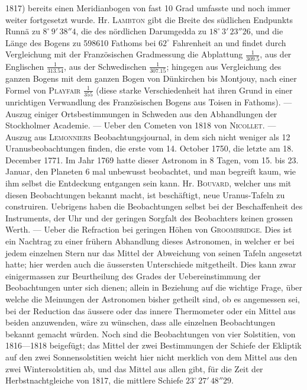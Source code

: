 1817) bereits einen Meridianbogen von fast 10 Grad umfasste und noch immer weiter fortgesetzt wurde. Hr. \textsc{Lambton} gibt die Breite des südlichen Endpunkts Runnä zu $8^\circ\,9'\,38''4$, die des nördlichen Darumgedda zu $18^\circ\,3'\,23''26$, und die Länge des Bogens zu 598610 Fathoms bei $62^\circ$ Fahrenheit an und findet durch Vergleichung mit der Französischen Gradmessung die Abplattung $\frac{1}{309.5}$, aus der Englischen $\frac{1}{313.54}$, aus der Schwedischen $\frac{1}{307.15}$; hingegen aus Vergleichung des ganzen Bogens mit dem ganzen Bogen von Dünkirchen bis Montjouy, nach einer Formel von \textsc{Playfair} $\frac{1}{355}$ (diese starke Verschiedenheit hat ihren Grund in einer unrichtigen Verwandlung des Französischen Bogens aus Toisen in Fathoms). --- Auszug einiger Ortsbestimmungen in Schweden aus den Abhandlungen der Stockholmer Academie. --- Ueber den Cometen von 1818 von \textsc{Nicollet}. --- Auszug aus \textsc{Lemonniers} Beobachtungsjournal, in dem sich nicht weniger als 12 Uranusbeobachtungen finden, die erste vom 14. October 1750, die letzte am 18. December 1771. Im Jahr 1769 hatte dieser Astronom in 8 Tagen, vom 15. bis 23. Januar, den Planeten 6 mal unbewusst beobachtet, und man begreift kaum, wie ihm selbst die Entdeckung entgangen sein kann. Hr. \textsc{Bouvard}, welcher uns mit diesen Beobachtungen bekannt macht, ist beschäftigt, neue Uranus-Tafeln zu construiren. Uebrigens haben die Beobachtungen selbst bei der Beschaffenheit des Instruments, der Uhr und der geringen Sorgfalt des Beobachters keinen grossen Werth. --- Ueber die Refraction bei geringen Höhen von \textsc{Groombridge}. Dies ist ein Nachtrag zu einer frühern Abhandlung dieses Astronomen, in welcher er bei jedem einzelnen Stern nur das Mittel der Abweichung von seinen Tafeln angesetzt hatte; hier werden auch die äussersten Unterschiede mitgetheilt. Dies kann zwar einigermassen zur Beurtheilung des Grades der Uebereinstimmung der Beobachtungen unter sich dienen; allein in Beziehung auf die wichtige Frage, über welche die Meinungen der Astronomen bisher getheilt sind, ob es angemessen sei, bei der Reduction das äussere oder das innere Thermometer oder ein Mittel aus beiden anzuwenden, wäre zu wünschen, dass alle einzelnen Beobachtungen bekannt gemacht würden. Noch sind die Beobachtungen von vier Solstitien, von 1816---1818 beigefügt; das Mittel der zwei Bestimmungen der Schiefe der Ekliptik auf den zwei Sonnensolstitien weicht hier nicht merklich von dem Mittel aus den zwei Wintersolstitien ab, und das Mittel aus allen gibt, für die Zeit der Herbstnachtgleiche von 1817, die mittlere Schiefe $23^\circ\,27'\,48''29$.
